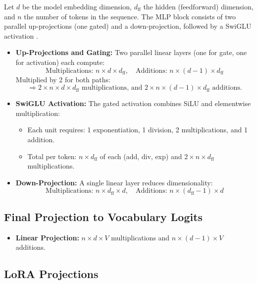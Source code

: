 \documentclass[a4paper,12pt]{article}
\begin{document}
Let $d$ be the model embedding dimension, $d_{\text{ff}}$ the hidden (feedforward) dimension, and $n$ the number of tokens in the sequence. The MLP block consists of two parallel up-projections (one gated) and a down-projection, followed by a SwiGLU activation \citep{shazeer2020glu}.

\begin{itemize}
  \item \textbf{Up-Projections and Gating:} Two parallel linear layers (one for gate, one for activation) each compute:
  \[
  \text{Multiplications: } n \times d \times d_{\text{ff}}, \quad
  \text{Additions: } n \times (d - 1) \times d_{\text{ff}}
  \]
  Multiplied by 2 for both paths:
  \[
  \Rightarrow 2 \times n \times d \times d_{\text{ff}} \text{ multiplications, and } 2 \times n \times (d - 1) \times d_{\text{ff}} \text{ additions.}
  \]

  \item \textbf{SwiGLU Activation:} The gated activation combines SiLU and elementwise multiplication:
  \begin{itemize}
    \item Each unit requires: 1 exponentiation, 1 division, 2 multiplications, and 1 addition.
    \item Total per token: $n \times d_{\text{ff}}$ of each (add, div, exp) and $2 \times n \times d_{\text{ff}}$ multiplications.
  \end{itemize}

  \item \textbf{Down-Projection:} A single linear layer reduces dimensionality:
  \[
  \text{Multiplications: } n \times d_{\text{ff}} \times d, \quad
  \text{Additions: } n \times (d_{\text{ff}} - 1) \times d
  \]
\end{itemize}


\subsection*{Final Projection to Vocabulary Logits}
\begin{itemize}
  \item \textbf{Linear Projection:} $n \times d \times V$ multiplications and $n \times (d - 1) \times V$ additions.
\end{itemize}

\subsection*{LoRA Projections}
\end{document}
